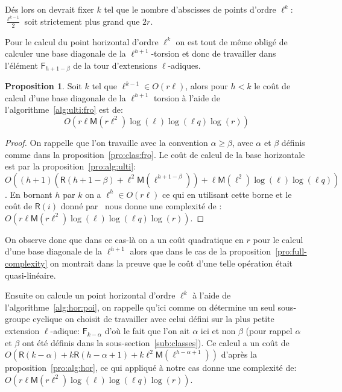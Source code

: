 \documentclass[10pt,a4paper]{book}
\theoremstyle{plain}
\theoremstyle{definition}
\theoremstyle{definition}
\theoremstyle{definition}
\newtheorem{prop}[thm]{Proposition}
\theoremstyle{definition}
\theoremstyle{remark}
\theoremstyle{remark}
\theoremstyle{definition}
\begin{document}
Dés lors on devrait fixer $k$ tel que le nombre d'abscisses de points d'ordre 
$\ell^k:$ $\frac{\ell^{k-1}}{2}$ soit strictement plus grand que $2r$.

Pour le calcul du point horizontal d'ordre $\ell^k$ on est tout de même obligé 
de calculer une base diagonale de la $\ell^{h+1}$-torsion et donc de 
travailler dans l'élément $\mathsf{F}_{h+1-\beta}$ de la tour d'extensions 
$\ell$-adiques.

\begin{prop}
Soit $k$ tel que $\ell^{k-1} \in O(r\ell)$, alors pour $h<k$ le coût de calcul d'une 
base diagonale de la $\ell^{h+1}$ torsion à l'aide de 
l'algorithme~\ref{alg:ulti:fro} est de:
\[
O(r \ell \mathsf{M}(r\ell^{2})\log(\ell)\log(\ell q) \log(r))
\]
\end{prop}

\begin{proof}
On rappelle que l'on travaille avec la convention $\alpha \geqslant \beta$, 
avec $\alpha$ et $\beta$ définis comme dans la proposition~\ref{pro:clas:fro}.
Le coût de calcul de la base horizontale est par la proposition~\ref{pro:alg:ulti}:
$O((h+1)(\mathsf{R}(h+1-\beta)+\ell^2 \mathsf{M}(\ell^{h+1-\beta}))+\ell \mathsf{M}(\ell^2)\log(\ell)\log(\ell q))$. 
En bornant $h$ par $k$ on a $\ell^h \in O(r\ell)$ ce qui en utilisant cette
borne et le coût de $\mathsf{R}(i)$ donné par~\cite[chapter 14.5]{vzGJG03} nous 
donne une complexité de :
$O(r \ell \mathsf{M}(r\ell^{2})\log(\ell)\log(\ell q) \log(r))$.
\end{proof}
On observe donc que dans ce cas-là on a un coût quadratique en $r$ pour le 
calcul d'une base diagonale de la $\ell^{h+1}$ alors que dans le cas de la 
proposition~\ref{pro:full-complexity} on montrait dans la preuve que le coût 
d'une telle opération était quasi-linéaire.

Ensuite on calcule un point horizontal d'ordre $\ell^k$ à l'aide de 
l'algorithme~\ref{alg:hor:poi}, on rappelle qu'ici comme on détermine un seul 
sous-groupe cyclique on choisit de travailler avec celui défini 
sur la plus petite extension $\ell$-adique: $\mathsf{F}_{k-\alpha}$ d'où le 
fait que l'on ait $\alpha$ ici et non $\beta$ (pour rappel $\alpha$ et $\beta$ 
ont été définis dans la sous-section~\ref{sub:classes}). Ce calcul a un coût de 
$O(\mathsf{R}(k-\alpha) + k\mathsf{R}(h-\alpha+1) + k\ell^2\mathsf{M}(\ell^{h-\alpha+1}))$
d'après la proposition~\ref{pro:alg:hor}, ce qui appliqué à notre cas donne 
une complexité de: $O(r \ell \mathsf{M}(r \ell^{2})\log(\ell)\log(\ell q) \log(r))$.
\end{document}
